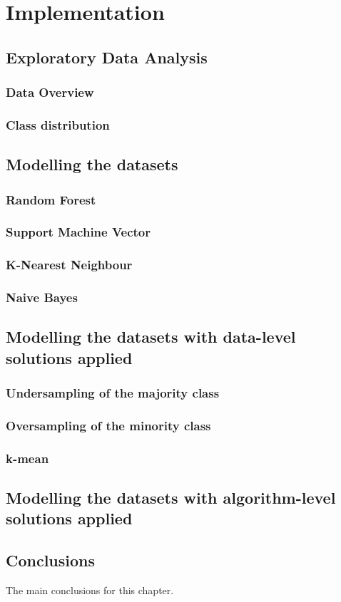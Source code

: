 \chapter{Implementation}\label{ch:Implementation}

\section{Exploratory Data Analysis}
\subsection{Data Overview}
\subsection{Class distribution}
\section{Modelling the datasets}
\subsection{Random Forest}
\subsection{Support Machine Vector}
\subsection{K-Nearest Neighbour}
\subsection{Naive  Bayes}
\section{Modelling the datasets with data-level solutions applied}
\subsection{Undersampling of the majority class}
\subsection{Oversampling of the minority class}
\subsection{k-mean}
\section{Modelling the datasets with algorithm-level solutions applied}

\section{Conclusions}

The main conclusions for this chapter.


